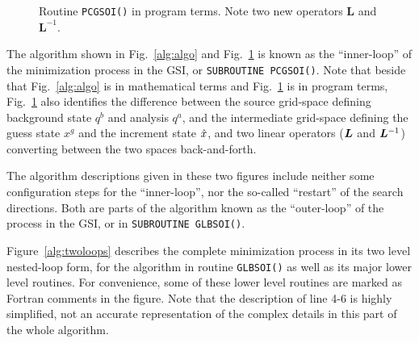 \documentclass{article}
\begin{document}
%
\begin{figure}[hb]

\caption{Routine {\tt PCGSOI()} in program terms.
Note two new operators ${\bm L}$ and ${\bm L}^{-1}$.
} \label{alg:code}
\end{figure}

The algorithm shown in Fig.~\ref{alg:algo} and Fig.~\ref{alg:code} is
known as the ``inner-loop'' of the minimization process in the GSI, or
\verb"SUBROUTINE PCGSOI()".  Note that beside that Fig.~\ref{alg:algo}
is in mathematical terms and Fig.~\ref{alg:code} is in program terms,
Fig.~\ref{alg:code} also identifies the difference between the source
grid-space defining background state $q^b$ and analysis $q^a$, and the
intermediate grid-space defining the guess state $x^g$ and the
increment state ${\hat{x}}$, and two linear operators
($\bm L$ and $\bm L^{-1}$) converting between
the two spaces back-and-forth.

The algorithm descriptions given in these two figures
include neither some configuration steps for the ``inner-loop'', nor
the so-called ``restart'' of the search directions.  Both are parts of
the algorithm known as the ``outer-loop'' of the process in the GSI,
or in \verb"SUBROUTINE GLBSOI()".

Figure~\ref{alg:twoloops} describes
the complete minimization process in its two level nested-loop form,
for the algorithm in routine \verb"GLBSOI()" as well as
its major lower level routines.
For convenience, some of these lower level
routines are marked as Fortran comments in the figure.
Note that the description of line 4-6 is highly simplified,
not an accurate representation of the complex details in this
part of the whole algorithm.
\end{document}
